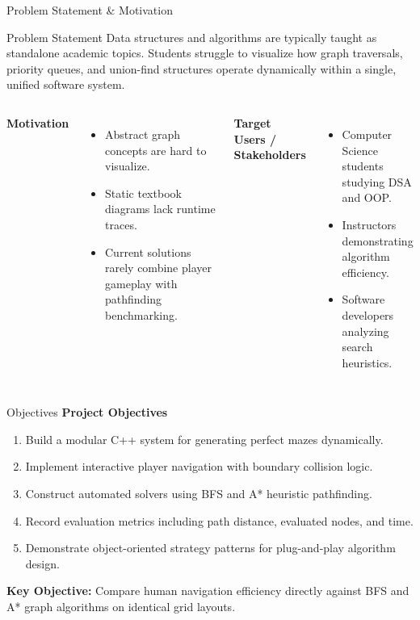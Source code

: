 \documentclass[aspectratio=169,11pt]{beamer}
\begin{document}
\begin{frame}{Problem Statement \& Motivation}
\begin{block}{Problem Statement}
\small Data structures and algorithms are typically taught as standalone academic topics. Students struggle to visualize how graph traversals, priority queues, and union-find structures operate dynamically within a single, unified software system.
\end{block}
\vspace{2mm}
\begin{columns}[T,totalwidth=\textwidth]
\textbf{\color{GEUBlue}Motivation}
\begin{itemize}\itemsep2pt
\item Abstract graph concepts are hard to visualize.
\item Static textbook diagrams lack runtime traces.
\item Current solutions rarely combine player gameplay with pathfinding benchmarking.
\end{itemize}
\textbf{\color{GEUBlue}Target Users / Stakeholders}
\begin{itemize}\itemsep2pt
\item Computer Science students studying DSA and OOP.
\item Instructors demonstrating algorithm efficiency.
\item Software developers analyzing search heuristics.
\end{itemize}
\end{columns}
\end{frame}

\begin{frame}{Objectives}
\textbf{\color{GEUBlue}Project Objectives}
\vspace{2mm}
\begin{enumerate}\itemsep5pt
\item Build a modular C++ system for generating perfect mazes dynamically.
\item Implement interactive player navigation with boundary collision logic.
\item Construct automated solvers using BFS and A* heuristic pathfinding.
\item Record evaluation metrics including path distance, evaluated nodes, and time.
\item Demonstrate object-oriented strategy patterns for plug-and-play algorithm design.
\end{enumerate}
\vfill
\begin{center}
\colorbox{GEULightBlue}{\parbox{.80\textwidth}{\centering
\textbf{Key Objective:} Compare human navigation efficiency directly against BFS and A* graph algorithms on identical grid layouts.}}
\end{center}
\end{frame}
\end{document}
